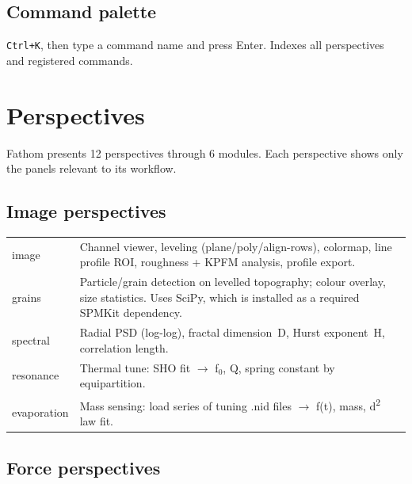 \documentclass[a4paper,11pt]{article}
\begin{document}
\subsection{Command palette}
\texttt{Ctrl+K}, then type a command name and press Enter. Indexes all perspectives and
registered commands.

\section{Perspectives}

Fathom presents 12 perspectives through 6 modules. Each perspective shows only the
panels relevant to its workflow.

\subsection{Image perspectives}

\begin{longtable}{@{}>{\ttfamily}l p{9cm}@{}}
\toprule
\multicolumn{2}{c}{\textbf{Module: image}}\\
\midrule
image & Channel viewer, leveling (plane/poly/align-rows), colormap, line profile ROI, roughness + KPFM analysis, profile export.\\
grains & Particle/grain detection on levelled topography; colour overlay, size statistics. Uses SciPy, which is installed as a required SPMKit dependency.\\
spectral & Radial PSD (log-log), fractal dimension~D, Hurst exponent~H, correlation length.\\
resonance & Thermal tune: SHO fit $\rightarrow$ f$_0$, Q, spring constant by equipartition.\\
evaporation & Mass sensing: load series of tuning .nid files $\rightarrow$ f(t), mass, d\textsuperscript{2} law fit.\\
\bottomrule
\end{longtable}

\subsection{Force perspectives}
\end{document}
